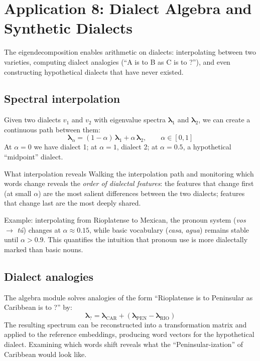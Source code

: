 \documentclass[11pt,a4paper]{article}
\begin{document}
\section{Application 8: Dialect Algebra and Synthetic Dialects}
\label{sec:app-algebra}

\begin{appbox}
The eigendecomposition enables arithmetic on dialects: interpolating
between two varieties, computing dialect analogies (``A is to B as C
is to ?''), and even constructing hypothetical dialects that have
never existed.
\end{appbox}

\subsection{Spectral interpolation}

Given two dialects $v_1$ and $v_2$ with eigenvalue spectra
$\boldsymbol{\lambda}_1$ and $\boldsymbol{\lambda}_2$, we can create
a continuous path between them:
\[
\boldsymbol{\lambda}_\alpha
= (1 - \alpha)\,\boldsymbol{\lambda}_1
+ \alpha\,\boldsymbol{\lambda}_2, \qquad \alpha \in [0, 1]
\]
At $\alpha = 0$ we have dialect 1; at $\alpha = 1$, dialect 2; at
$\alpha = 0.5$, a hypothetical ``midpoint'' dialect.

\begin{howbox}{What interpolation reveals}
Walking the interpolation path and monitoring which words change
reveals the \emph{order of dialectal features}: the features that
change first (at small $\alpha$) are the most salient differences
between the two dialects; features that change last are the most
deeply shared.

Example: interpolating from Rioplatense to Mexican, the pronoun
system (\emph{vos} $\to$ \emph{t\'u}) changes at $\alpha \approx
0.15$, while basic vocabulary (\emph{casa}, \emph{agua}) remains
stable until $\alpha > 0.9$. This quantifies the intuition that
pronoun use is more dialectally marked than basic nouns.
\end{howbox}

\subsection{Dialect analogies}

The algebra module solves analogies of the form ``Rioplatense is to
Peninsular as Caribbean is to ?'' by:
\[
\boldsymbol{\lambda}_? = \boldsymbol{\lambda}_{\text{CAR}}
+ (\boldsymbol{\lambda}_{\text{PEN}} - \boldsymbol{\lambda}_{\text{RIO}})
\]
The resulting spectrum can be reconstructed into a transformation
matrix and applied to the reference embeddings, producing word vectors
for the hypothetical dialect. Examining which words shift reveals what
the ``Peninsular-ization'' of Caribbean would look like.
\end{document}
